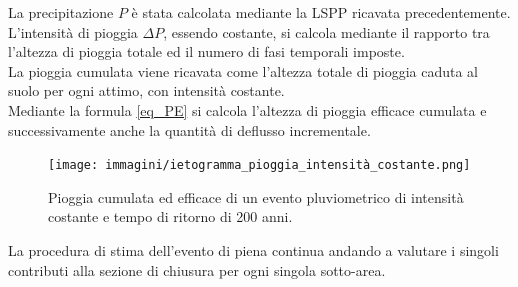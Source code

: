 La precipitazione $P$ è stata calcolata mediante la LSPP ricavata precedentemente.\\
L'intensità di pioggia $\Delta P$, essendo costante, si calcola mediante il rapporto tra l'altezza di pioggia totale ed il numero di fasi temporali imposte.\\
La pioggia cumulata viene ricavata come l'altezza totale di pioggia caduta al suolo per ogni attimo, con intensità costante.\\
Mediante la formula \ref{eq_PE} si calcola l'altezza di pioggia efficace cumulata e successivamente anche la quantità di deflusso incrementale. 
\begin{figure}[H]  \centering
    \texttt{[image: immagini/ietogramma\_pioggia\_intensità\_costante.png]}
    \caption{Pioggia cumulata ed efficace di un evento pluviometrico di intensità costante e tempo di ritorno di 200 anni.}
    \label{ietogramma_pioggia_intensità_costante}
\end{figure}

La procedura di stima dell'evento di piena continua andando a valutare i singoli contributi alla sezione di chiusura per ogni singola sotto-area.

